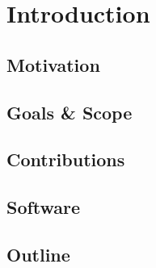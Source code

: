 \chapter{Introduction}
\label{ch:introduction}


\section{Motivation}
\label{sec:motivation}


\section{Goals \& Scope}
\label{sec:goals-scope}


\section{Contributions}
\label{sec:contribution}


\section{Software}
\label{sec:software}


\section{Outline}
\label{sec:outline}
